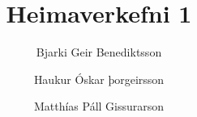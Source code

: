 
\usepackage{amsfonts}
\usepackage{epstopdf}
\title{Heimaverkefni 1}
\author{Bjarki Geir Benediktsson \and Haukur Óskar þorgeirsson \and Matthías Páll Gissurarson}

\maketitle

\section{}




\section{}

 


